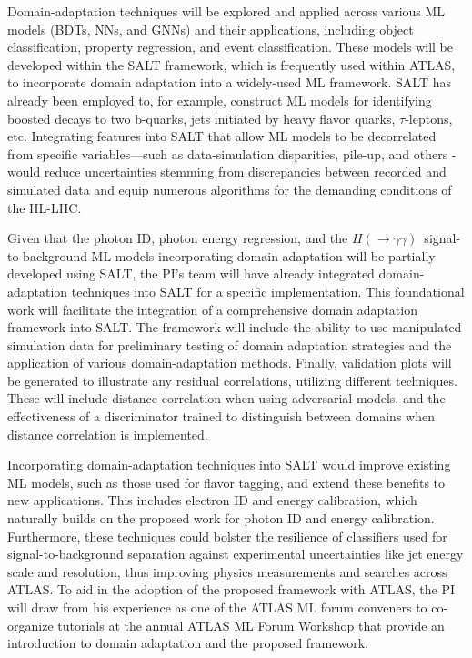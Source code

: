 \documentclass[letter, USenglish, 11pt, subfigure]{article}
\newcommand{\hyy}{\ensuremath{H(\to\gamma\gamma)}}
\begin{document}
Domain-adaptation techniques will be explored and applied across various ML models (BDTs, NNs, and GNNs) and their applications, including object classification, property regression, and event classification. These models will be developed within the SALT framework, which is frequently used within ATLAS, to incorporate domain adaptation into a widely-used ML framework. SALT has already been employed to, for example, construct ML models for identifying boosted decays to two b-quarks, jets initiated by heavy flavor quarks, $\tau$-leptons, etc. Integrating features into SALT that allow ML models to be decorrelated from specific variables—such as data-simulation disparities, pile-up, and others - would reduce uncertainties stemming from discrepancies between recorded and simulated data and equip numerous algorithms for the demanding conditions of the HL-LHC.

Given that the photon ID, photon energy regression, and the \hyy\ signal-to-background ML models incorporating domain adaptation will be partially developed using SALT, the PI's team will have already integrated domain-adaptation techniques into SALT for a specific implementation. This foundational work will facilitate the integration of a comprehensive domain adaptation framework into SALT. The framework will include the ability to use manipulated simulation data for preliminary testing of domain adaptation strategies and the application of various domain-adaptation methods. Finally, validation plots will be generated to illustrate any residual correlations, utilizing different techniques. These will include distance correlation when using adversarial models, and the effectiveness of a discriminator trained to distinguish between domains when distance correlation is implemented.

Incorporating domain-adaptation techniques into SALT would improve existing ML models, such as those used for flavor tagging, and extend these benefits to new applications. This includes electron ID and energy calibration, which naturally builds on the proposed work for photon ID and energy calibration. Furthermore, these techniques could bolster the resilience of classifiers used for signal-to-background separation against experimental uncertainties like jet energy scale and resolution, thus improving physics measurements and searches across ATLAS. To aid in the adoption of the proposed framework with ATLAS, the PI will draw from his experience as one of the ATLAS ML forum conveners to co-organize tutorials at the annual ATLAS ML Forum Workshop that provide an introduction to domain adaptation and the proposed framework.
\end{document}
